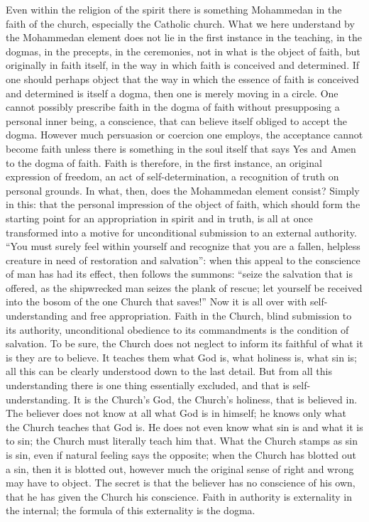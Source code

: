 \documentclass[12pt,a4paper,openany]{book}
\newcommand{\opage}[1]{\marginnote{\footnotesize\textit{[#1]}}}
\begin{document}
Even within the religion of the spirit there is something Mohammedan in
the faith of the church, especially the Catholic church. What we here
understand by the Mohammedan element does not lie in the first instance
in the teaching, in the dogmas, in the precepts, in the ceremonies, not
in what is the object of faith, but originally in faith itself, in the
way in which faith is conceived and determined. If one should perhaps
object that the way in which the essence of faith is conceived and
determined is itself a dogma, then one is merely moving in a circle. One
cannot possibly prescribe faith in the \opage{21}dogma of faith without
presupposing a personal inner being, a conscience, that can believe
itself obliged to accept the dogma. However much persuasion or coercion
one employs, the acceptance cannot become faith unless there is
something in the soul itself that says Yes and Amen to the dogma of
faith. Faith is therefore, in the first instance, an original
expression of freedom, an act of self-determination, a recognition of
truth on personal grounds. In what, then, does the Mohammedan element
consist? Simply in this: that the personal impression of the object of
faith, which should form the starting point for an appropriation in
spirit and in truth, is all at once transformed into a motive for
unconditional submission to an external authority. ``You must surely
feel within yourself and recognize that you are a fallen, helpless
creature in need of restoration and salvation'': when this appeal to the
conscience of man has had its effect, then follows the summons: ``seize
the salvation that is offered, as the shipwrecked man seizes the plank
of rescue; let yourself be received into the bosom of the one Church
that saves!'' Now it is all over with self-understanding and free
appropriation. Faith in the Church, blind submission to its authority,
unconditional obedience to its commandments is the condition of
salvation. To be sure, the Church does not neglect to inform its faithful
of what it is they are to believe. It teaches them what God is, what
holiness is, what sin is; all this can be clearly understood down to
the last detail. But from all this understanding there is one thing
essentially excluded, and that is self-understanding. It is the Church's
God, the Church's holiness, that is believed in. The believer does not
know at all what God is in himself; he knows only what the Church teaches
that God is. He does not even know what sin is and what it is to sin;
\opage{22}the Church must literally teach him that. What the Church stamps as sin
is sin, even if natural feeling says the opposite; when the Church has
blotted out a sin, then it is blotted out, however much the original
sense of right and wrong may have to object. The secret is that the
believer has no conscience of his own, that he has given the Church his
conscience. Faith in authority is externality in the internal; the
formula of this externality is the dogma.
\end{document}
